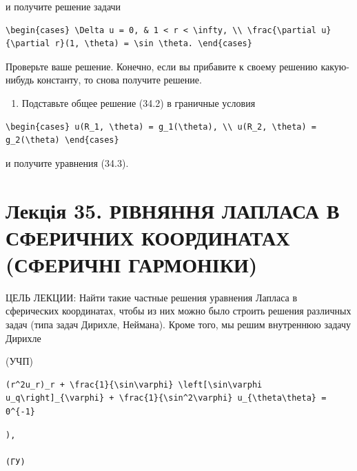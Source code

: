 \documentclass[
  ukrainian,
]{article}
\providecommand{\tightlist}{%
  \setlength{\itemsep}{0pt}\setlength{\parskip}{0pt}}
\begin{document}
и получите решение задачи

\begin{verbatim}
\begin{cases} \Delta u = 0, & 1 < r < \infty, \\ \frac{\partial u}{\partial r}(1, \theta) = \sin \theta. \end{cases}
\end{verbatim}

Проверьте ваше решение. Конечно, если вы прибавите к своему решению
какую-нибудь константу, то снова получите решение.

\begin{enumerate}
\def\labelenumi{\arabic{enumi}.}
\setcounter{enumi}{3}
\tightlist
\item
  Подставьте общее решение (34.2) в граничные условия
\end{enumerate}

\begin{verbatim}
\begin{cases} u(R_1, \theta) = g_1(\theta), \\ u(R_2, \theta) = g_2(\theta) \end{cases}
\end{verbatim}

и получите уравнения (34.3).

\section{Лекція 35. РІВНЯННЯ ЛАПЛАСА В СФЕРИЧНИХ КООРДИНАТАХ (СФЕРИЧНІ
ГАРМОНІКИ)}\label{ux43bux435ux43aux446ux456ux44f-35.-ux440ux456ux432ux43dux44fux43dux43dux44f-ux43bux430ux43fux43bux430ux441ux430-ux432-ux441ux444ux435ux440ux438ux447ux43dux438ux445-ux43aux43eux43eux440ux434ux438ux43dux430ux442ux430ux445-ux441ux444ux435ux440ux438ux447ux43dux456-ux433ux430ux440ux43cux43eux43dux456ux43aux438}

ЦЕЛЬ ЛЕКЦИИ: Найти такие частные решения уравнения Лапласа в сферических
координатах, чтобы из них можно было строить решения различных задач
(типа задач Дирихле, Неймана). Кроме того, мы решим внутреннюю задачу
Дирихле

(УЧП)

\begin{verbatim}
(r^2u_r)_r + \frac{1}{\sin\varphi} \left[\sin\varphi u_q\right]_{\varphi} + \frac{1}{\sin^2\varphi} u_{\theta\theta} = 0^{-1}
\end{verbatim}

\begin{verbatim}
),

(ГУ)
\end{verbatim}
\end{document}
